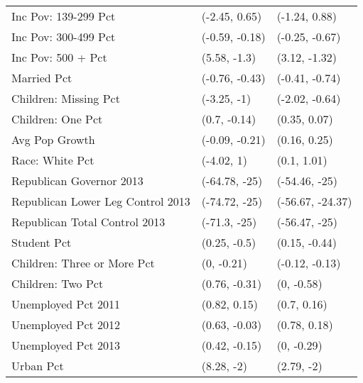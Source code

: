 \begin{table}[ht]
\begin{tabular}{lll}
  Inc Pov: 139-299 Pct & (-2.45, 0.65) & (-1.24, 0.88) \\ 
  Inc Pov: 300-499 Pct & (-0.59, -0.18) & (-0.25, -0.67) \\ 
  Inc Pov: 500 + Pct & (5.58, -1.3) & (3.12, -1.32) \\ 
  Married Pct & (-0.76, -0.43) & (-0.41, -0.74) \\ 
  Children: Missing Pct & (-3.25, -1) & (-2.02, -0.64) \\ 
  Children: One Pct & (0.7, -0.14) & (0.35, 0.07) \\ 
  Avg Pop Growth & (-0.09, -0.21) & (0.16, 0.25) \\ 
  Race: White Pct & (-4.02, 1) & (0.1, 1.01) \\ 
  Republican Governor 2013 & (-64.78, -25) & (-54.46, -25) \\ 
  Republican Lower Leg Control 2013 & (-74.72, -25) & (-56.67, -24.37) \\ 
  Republican Total Control 2013 & (-71.3, -25) & (-56.47, -25) \\ 
  Student Pct & (0.25, -0.5) & (0.15, -0.44) \\ 
  Children: Three or More Pct & (0, -0.21) & (-0.12, -0.13) \\ 
  Children: Two Pct & (0.76, -0.31) & (0, -0.58) \\ 
  Unemployed Pct 2011 & (0.82, 0.15) & (0.7, 0.16) \\ 
  Unemployed Pct 2012 & (0.63, -0.03) & (0.78, 0.18) \\ 
  Unemployed Pct 2013 & (0.42, -0.15) & (0, -0.29) \\ 
  Urban Pct & (8.28, -2) & (2.79, -2) \\ 
   \hline
\end{tabular}
\end{table}